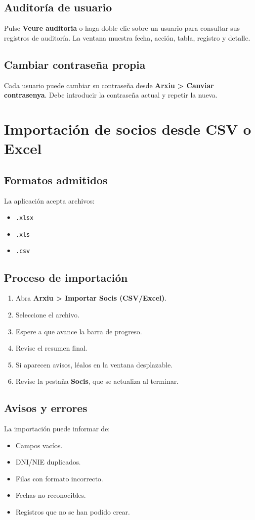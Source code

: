 \documentclass[12pt]{article}
\newcommand{\boton}[1]{\textbf{#1}}
\newcommand{\menu}[1]{\textbf{#1}}
\begin{document}
\subsection{Auditoría de usuario}
Pulse \boton{Veure auditoria} o haga doble clic sobre un usuario para consultar sus registros de auditoría. La ventana muestra fecha, acción, tabla, registro y detalle.

\subsection{Cambiar contraseña propia}
Cada usuario puede cambiar su contraseña desde \menu{Arxiu > Canviar contrasenya}. Debe introducir la contraseña actual y repetir la nueva.

\section{Importación de socios desde CSV o Excel}
\subsection{Formatos admitidos}
La aplicación acepta archivos:
\begin{itemize}
  \item \texttt{.xlsx}
  \item \texttt{.xls}
  \item \texttt{.csv}
\end{itemize}

\subsection{Proceso de importación}
\begin{enumerate}
  \item Abra \menu{Arxiu > Importar Socis (CSV/Excel)}.
  \item Seleccione el archivo.
  \item Espere a que avance la barra de progreso.
  \item Revise el resumen final.
  \item Si aparecen avisos, léalos en la ventana desplazable.
  \item Revise la pestaña \menu{Socis}, que se actualiza al terminar.
\end{enumerate}

\subsection{Avisos y errores}
La importación puede informar de:
\begin{itemize}
  \item Campos vacíos.
  \item DNI/NIE duplicados.
  \item Filas con formato incorrecto.
  \item Fechas no reconocibles.
  \item Registros que no se han podido crear.
\end{itemize}
\end{document}
